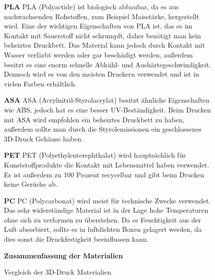 \begin{figure}
\textbf{PLA}
PLA (Polyactide) ist biologisch abbaubar, da es aus nachwachsenden Rohstoffen, zum Beispiel Maisstärke, hergestellt wird.
Eine der wichtigen Eigenschaften von PLA ist, das es im Kontakt mit Sauerstoff nicht schrumpft, daher benötigt man kein beheiztes
Druckbett. Das Material kann jedoch durch Kontakt mit Wasser verfärbt werden oder gar beschädigt werden, außerdem besitzt
es eine enorm schnelle Abkühl- und Aushärtegeschwindigkeit. Dennoch wird es von den meisten Druckern verwendet und ist
in vielen Farben erhältlich.

\textbf{ASA}
ASA (Acrylnitril-Styrolacrylat) besitzt ähnliche Eigenschaften wie ABS, jedoch hat es eine besser UV-Beständigkeit.
Beim Drucken mit ASA wird empfohlen ein beheiztes Druckbett zu haben, außerdem sollte man durch die Styrolemissionen
ein geschlossenes 3D-Druck Gehäuse haben.

\textbf{PET}
PET (Polyethylenterephthalat) wird hauptsächlich für Kunststoffprodukte die Kontakt mit Lebensmittel haben verwendet.
Es ist außerdem zu 100 Prozent recycelbar und gibt beim Drucken keine Gerüche ab.

\textbf{PC}
PC (Polycarbonat) wird meist für technische Zwecke verwendet. Das sehr widerständige Material ist in der Lage hohe
Temperaturen ohne sich zu verformen zu überstehen. Da es Feuchtigkeit aus der Luft absorbiert, sollte es in luftdichten
Boxen gelagert werden, da dies sonst die Druckfestigkeit beeinflussen kann.

\textbf{Zusammenfassung der Materialien}

\begin{table}[H]
\centering
{}
    \caption{Vergleich der 3D-Druck Materialien}
\end{table}


\end{figure}
